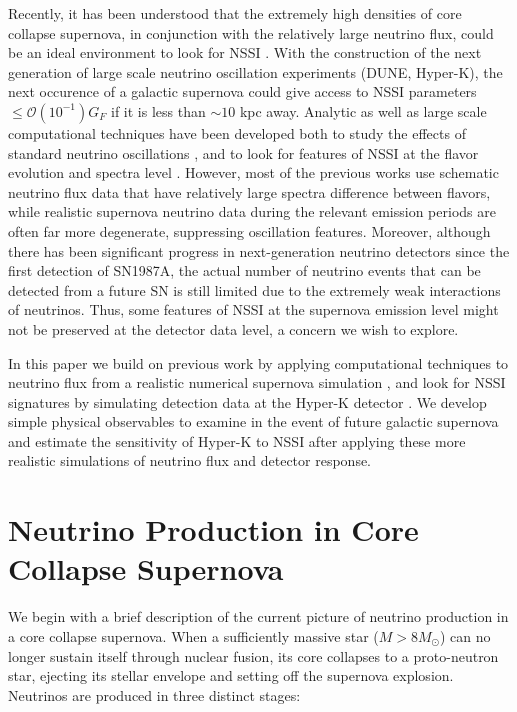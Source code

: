 \documentclass[a4paper,12pt]{article}
\begin{document}
Recently, it has been understood that the extremely high densities of core collapse supernova, in conjunction with the relatively large neutrino flux, could be an ideal environment to look for NSSI \cite{Raffelt:2013rqa,Blennow:2008er,Nakazato:2012qf,Dighe:2017sur,Das:2017iuj,Duan:2006an,Duan:2008eb}. With the construction of the next generation of large scale neutrino oscillation experiments (DUNE, Hyper-K), the next occurence of a galactic supernova could give access to NSSI parameters $\leq\mathcal{O}(10^{-1})G_{F}$ if it is less than $\sim10$ kpc away. Analytic as well as large scale computational techniques have been developed both to study the effects of standard neutrino oscillations \cite{Duan:2006an,Duan:2008eb,Fogli:2004ff,Dighe:1999bi,Doring:2019axc,Shalgar:2019kzy}, and to look for features of NSSI at the flavor evolution and spectra level \cite{Dighe:2017sur,Kharlanov:2019cpk}. However, most of the previous works use schematic neutrino flux data that have relatively large spectra difference between flavors, while realistic supernova neutrino data during the relevant emission periods are often far more degenerate, suppressing oscillation features. Moreover, although there has been significant progress in next-generation neutrino detectors since the first detection of SN1987A, the actual number of neutrino events that can be detected from a future SN is still limited due to the extremely weak interactions of neutrinos. Thus, some features of NSSI at the supernova emission level might not be preserved at the detector data level, a concern we wish to explore.

	In this paper we build on previous work by applying computational techniques to neutrino flux from a realistic numerical supernova simulation \cite{Nakazato:2012qf}, and look for NSSI signatures by simulating detection data at the Hyper-K detector \cite{Abe:2018uyc}. We develop simple physical observables to examine in the event of future galactic supernova and estimate the sensitivity of Hyper-K to NSSI after applying these more realistic simulations of neutrino flux and detector response.

\section{Neutrino Production in Core Collapse Supernova}
We begin with a brief description of the current picture of neutrino production in a core collapse supernova. When a sufficiently massive star ($M > 8M_{\odot}$) can no longer sustain itself through nuclear fusion, its core collapses to a proto-neutron star, ejecting its stellar envelope and setting off the supernova explosion. Neutrinos are produced in three distinct stages:
\end{document}
